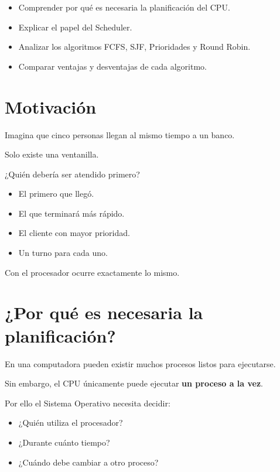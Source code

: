 \documentclass[
  spanish,
  letterpaper,
]{scrbook}
\providecommand{\tightlist}{%
  \setlength{\itemsep}{0pt}\setlength{\parskip}{0pt}}
\begin{document}
\begin{itemize}
\tightlist
\item
  Comprender por qué es necesaria la planificación del CPU.
\item
  Explicar el papel del Scheduler.
\item
  Analizar los algoritmos FCFS, SJF, Prioridades y Round Robin.
\item
  Comparar ventajas y desventajas de cada algoritmo.
\end{itemize}


\chapter{Motivación}\label{motivaciuxf3n}

Imagina que cinco personas llegan al mismo tiempo a un banco.

Solo existe una ventanilla.

¿Quién debería ser atendido primero?

\begin{itemize}
\tightlist
\item
  El primero que llegó.
\item
  El que terminará más rápido.
\item
  El cliente con mayor prioridad.
\item
  Un turno para cada uno.
\end{itemize}

Con el procesador ocurre exactamente lo mismo.


\chapter{¿Por qué es necesaria la
planificación?}\label{por-quuxe9-es-necesaria-la-planificaciuxf3n}

En una computadora pueden existir muchos procesos listos para
ejecutarse.

Sin embargo, el CPU únicamente puede ejecutar \textbf{un proceso a la
vez}.

Por ello el Sistema Operativo necesita decidir:

\begin{itemize}
\tightlist
\item
  ¿Quién utiliza el procesador?
\item
  ¿Durante cuánto tiempo?
\item
  ¿Cuándo debe cambiar a otro proceso?
\end{itemize}
\end{document}
